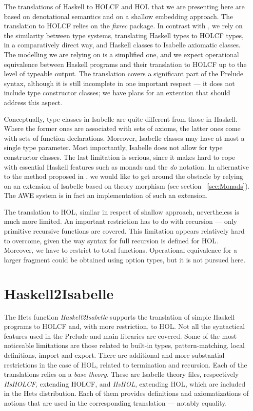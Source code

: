\documentclass{llncs}
\begin{document}
The translations of Haskell to HOLCF and HOL that we are presenting
here are based on denotational semantics and on a shallow embedding
approach.  The translation to HOLCF relies on the \emph{fixrec}
package. In contrast with \cite{Huff}, we rely on the similarity
between type systems, translating Haskell types to HOLCF types, in a
comparatively direct way, and Haskell classes to Isabelle axiomatic
classes. The modelling we are relying on is a simplified one, and we
expect operational equivalence between Haskell programs and their
translation to HOLCF up to the level of typeable output.  The
translation covers a significant part of the Prelude syntax, although
it is still incomplete in one important respect --- it does not
include type constructor classes; we have plans for an extention that
should address this aspect.

Conceptually, type classes in Isabelle are quite different from those
in Haskell. Where the former ones are associated with sets of axioms,
the latter ones come with sets of function declarations. Moreover,
Isabelle classes may have at most a single type parameter.  Most
importantly, Isabelle does not allow for type constructor classes. The
last limitation is serious, since it makes hard to cope with essential
Haskell features such as monads and the \emph{do} notation.  In
alternative to the method proposed in \cite{Huff}, we would like to
get around the obstacle by relying on an extension of Isabelle based
on theory morphism (see section~ \ref{sec:Monads}). The AWE system
\cite{AWE} is in fact an implementation of such an extension.

The translation to HOL, similar in respect of shallow approach,
nevertheless is much more limited. An important restriction has to do
with recursion --- only primitive recursive functions are covered.
This limitation appears relatively hard to overcome, given the way
syntax for full recursion is defined for HOL. Moreover, we have to
restrict to total functions. Operational equivalence for a larger
fragment could be obtained using option types, but it is not pursued
here.


\section{Haskell2Isabelle}

The Hets function \emph{Haskell2Isabelle} supports the translation of
simple Haskell programs to HOLCF and, with more restriction, to HOL.
Not all the syntactical features used in the Prelude and main
libraries are covered. Some of the most noticeable limitations are
those related to built-in types, pattern-matching, local definitions,
import and export. There are additional and more substantial
restrictions in the case of HOL, related to termination and recursion.
Each of the translations relies on a \emph{base theory}. These are
Isabelle theory files, respectively \emph{HsHOLCF}, extending HOLCF,
and \emph{HsHOL}, extending HOL, which are included in the Hets
distribution. Each of them provides definitions and axiomatizations of
notions that are used in the corresponding translation --- notably
equality.
\end{document}
